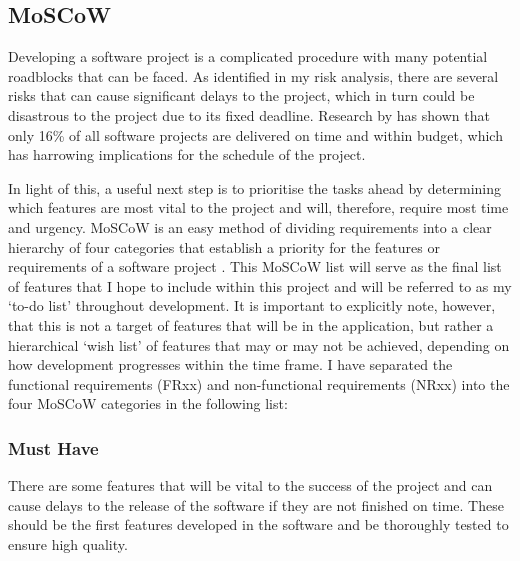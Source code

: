 \subsection{MoSCoW}
Developing a software project is a complicated procedure with many potential roadblocks that can be faced.
As identified in my risk analysis, there are several risks that can cause significant delays to the project, which in turn could be disastrous to the project due to its fixed deadline.
Research by \cite{requirementsprioritization} has shown that only 16\% of all software projects are delivered on time and within budget, which has harrowing implications for the schedule of the project.

In light of this, a useful next step is to prioritise the tasks ahead by determining which features are most vital to the project and will, therefore, require most time and urgency.
MoSCoW is an easy method of dividing requirements into a clear hierarchy of four categories that establish a priority for the features or requirements of a software project \citep[p.517]{hatton2008choosing}.
This MoSCoW list will serve as the final list of features that I hope to include within this project and will be referred to as my `to-do list' throughout development. 
It is important to explicitly note, however, that this is not a target of features that will be in the application, but rather a hierarchical `wish list' of features that may or may not be achieved, depending on how development progresses within the time frame.
I have separated the functional requirements (FRxx) and non-functional requirements (NRxx) into the four MoSCoW categories in the following list:

\subsubsection{Must Have}
There are some features that will be vital to the success of the project and can cause delays to the release of the software if they are not finished on time.
These should be the first features developed in the software and be thoroughly tested to ensure high quality.

